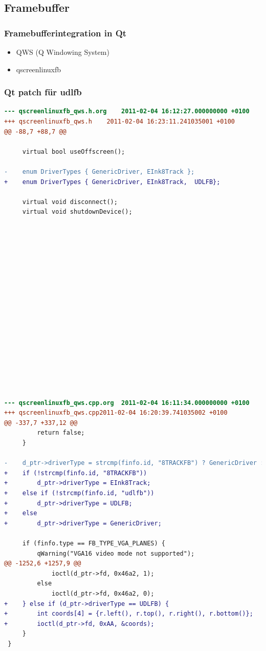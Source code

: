 \documentclass{beamer}
\begin{document}
  \subsection{Framebuffer}
  \begin{frame}
    \frametitle{Framebufferintegration in Qt}
    \begin{itemize}
      \item QWS (Q Windowing System)
      \item qscreenlinuxfb
    \end{itemize}
  \end{frame}
	\begin{frame}
		\frametitle{Qt patch für udlfb}
		\begin{lstlisting}[language=diff, basicstyle=\tiny]
--- qscreenlinuxfb_qws.h.org	2011-02-04 16:12:27.000000000 +0100
+++ qscreenlinuxfb_qws.h	2011-02-04 16:23:11.241035001 +0100
@@ -88,7 +88,7 @@
 
     virtual bool useOffscreen();
 
-    enum DriverTypes { GenericDriver, EInk8Track };
+    enum DriverTypes { GenericDriver, EInk8Track,  UDLFB};
 
     virtual void disconnect();
     virtual void shutdownDevice();	
     
     
     
     
     
     
     
     
     
     
     
     
     
     
     
     
     

--- qscreenlinuxfb_qws.cpp.org	2011-02-04 16:11:34.000000000 +0100
+++ qscreenlinuxfb_qws.cpp2011-02-04 16:20:39.741035002 +0100
@@ -337,7 +337,12 @@
         return false;
     }
 
-    d_ptr->driverType = strcmp(finfo.id, "8TRACKFB") ? GenericDriver : EInk8Track;
+    if (!strcmp(finfo.id, "8TRACKFB"))
+        d_ptr->driverType = EInk8Track;
+    else if (!strcmp(finfo.id, "udlfb"))
+        d_ptr->driverType = UDLFB;
+    else
+        d_ptr->driverType = GenericDriver;
 
     if (finfo.type == FB_TYPE_VGA_PLANES) {
         qWarning("VGA16 video mode not supported");
@@ -1252,6 +1257,9 @@
             ioctl(d_ptr->fd, 0x46a2, 1);
         else
             ioctl(d_ptr->fd, 0x46a2, 0);
+    } else if (d_ptr->driverType == UDLFB) {
+        int coords[4] = {r.left(), r.top(), r.right(), r.bottom()};
+        ioctl(d_ptr->fd, 0xAA, &coords);
     }
 }
		\end{lstlisting}
	\end{frame}
\end{document}
